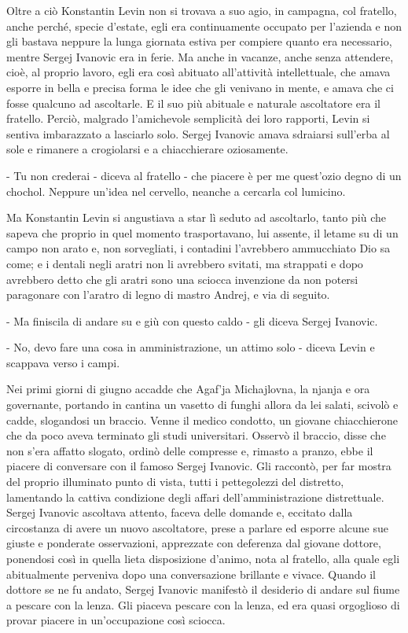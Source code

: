 Oltre a ciò Konstantin Levin non si trovava a suo agio, in campagna, col fratello, anche perché, specie d'estate, egli era continuamente occupato per l'azienda e non gli bastava neppure la lunga giornata estiva per compiere quanto era necessario, mentre Sergej Ivanovic era in ferie. Ma anche in vacanze, anche senza attendere, cioè, al proprio lavoro, egli era così abituato all'attività intellettuale, che amava esporre in bella e precisa forma le idee che gli venivano in mente, e amava che ci fosse qualcuno ad ascoltarle. E il suo più abituale e naturale ascoltatore era il fratello. Perciò, malgrado l'amichevole semplicità dei loro rapporti, Levin si sentiva imbarazzato a lasciarlo solo. Sergej Ivanovic amava sdraiarsi sull'erba al sole e rimanere a crogiolarsi e a chiacchierare oziosamente. 

- Tu non crederai - diceva al fratello - che piacere è per me quest'ozio degno di un chochol. Neppure un'idea nel cervello, neanche a cercarla col lumicino. 

Ma Konstantin Levin si angustiava a star lì seduto ad ascoltarlo, tanto più che sapeva che proprio in quel momento trasportavano, lui assente, il letame su di un campo non arato e, non sorvegliati, i contadini l'avrebbero ammucchiato Dio sa come; e i dentali negli aratri non li avrebbero svitati, ma strappati e dopo avrebbero detto che gli aratri sono una sciocca invenzione da non potersi paragonare con l'aratro di legno di mastro Andrej, e via di seguito. 

- Ma finiscila di andare su e giù con questo caldo - gli diceva Sergej Ivanovic. 

- No, devo fare una cosa in amministrazione, un attimo solo - diceva Levin e scappava verso i campi. 

Nei primi giorni di giugno accadde che Agaf'ja Michajlovna, la njanja e ora governante, portando in cantina un vasetto di funghi allora da lei salati, scivolò e cadde, slogandosi un braccio. Venne il medico condotto, un giovane chiacchierone che da poco aveva terminato gli studi universitari. Osservò il braccio, disse che non s'era affatto slogato, ordinò delle compresse e, rimasto a pranzo, ebbe il piacere di conversare con il famoso Sergej Ivanovic. Gli raccontò, per far mostra del proprio illuminato punto di vista, tutti i pettegolezzi del distretto, lamentando la cattiva condizione degli affari dell'amministrazione distrettuale. Sergej Ivanovic ascoltava attento, faceva delle domande e, eccitato dalla circostanza di avere un nuovo ascoltatore, prese a parlare ed esporre alcune sue giuste e ponderate osservazioni, apprezzate con deferenza dal giovane dottore, ponendosi così in quella lieta disposizione d'animo, nota al fratello, alla quale egli abitualmente perveniva dopo una conversazione brillante e vivace. Quando il dottore se ne fu andato, Sergej Ivanovic manifestò il desiderio di andare sul fiume a pescare con la lenza. Gli piaceva pescare con la lenza, ed era quasi orgoglioso di provar piacere in un'occupazione così sciocca. 

